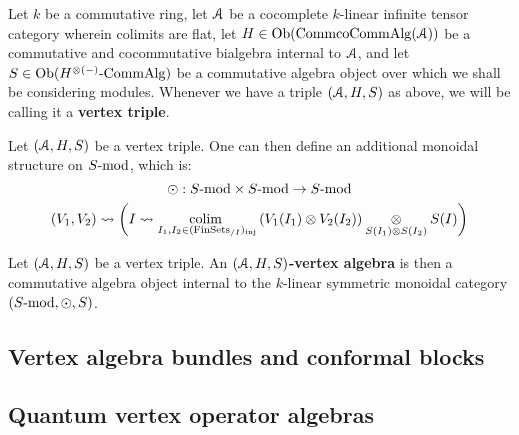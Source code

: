             \begin{convention} \label{conv: vertex_triples}
                Let $k$ be a commutative ring, let $\calA$ be a cocomplete $k$-linear infinite tensor category wherein colimits are flat, let $H \in \Ob(\Comm\co\Comm\Alg(\calA))$ be a commutative and cocommutative bialgebra internal to $\calA$, and let $S \in \Ob(H^{\tensor (-)}\-\Comm\Alg)$ be a commutative algebra object over which we shall be considering modules. Whenever we have a triple $(\calA, H, S)$ as above, we will be calling it a \textbf{vertex triple}.
            \end{convention}
            \begin{definition} \label{def: singular_tensor_products}
                Let $(\calA, H, S)$ be a vertex triple. One can then define an additional monoidal structure on $S\mod$, which is:
                    $$\singtensor: S\mod \x S\mod \to S\mod$$
                    $$(V_1, V_2) \mapsto \left( I \mapsto \underset{I_1, I_2 \in (\Fin\Sets_{/I})_{\inj}}{\colim} \left(V_1(I_1) \tensor V_2(I_2)\right) \tensor_{S(I_1) \tensor S(I_2)} S(I) \right)$$
            \end{definition}
            \begin{remark}
                
            \end{remark}
            \begin{definition} \label{def: (A, H, S)_vertex_algebras}
                Let $(\calA, H, S)$ be a vertex triple. An \textbf{$(\calA, H, S)$-vertex algebra} is then a commutative algebra object internal to the $k$-linear symmetric monoidal category $(S\mod, \singtensor, S)$.
            \end{definition}
            
    \subsection{Vertex algebra bundles and conformal blocks}
    
    \subsection{Quantum vertex operator algebras}